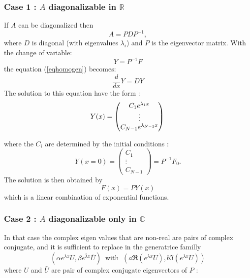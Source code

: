 \documentclass[a4paper,12pt]{article}
\begin{document}
 \subsubsection*{Case 1 : $A$ diagonalizable in $\mathbb{R}$}
 If $A$ can be diagonalized then 
  \begin{equation}
 A=P D P^{-1},
 \end{equation}
 where $D$ is  diagonal (with eigenvalues $\lambda_i$) and $P$ is the eigenvector matrix. 
 With the change of variable: 
 \begin{equation}
 Y=P^{-1}F
 \end{equation}
 the equation  (\ref{eqhomogen}) becomes:
  \begin{equation}
\frac{d}{dx}Y=DY
 \end{equation}
The solution to this equation have the form :\\

  \begin{equation}
  Y(x)=\begin{pmatrix}
 C_1 e^{\lambda_1 x} \\
  \vdots\\
 C_{N-1} e^{\lambda_{N-1} x}\end{pmatrix} \\
  \end{equation}
  
 where the $C_i$ are determined by the initial conditions : 
  \begin{equation}
 Y(x=0) =  \begin{pmatrix}
 C_1 \\
  \vdots\\
 C_{N-1}\end{pmatrix}  = P^{-1} F_0. 
 \end{equation}
 The solution is then obtained by 
   \begin{equation}
  F(x)=PY(x)
  \end{equation}
which is a linear combination of exponential functions.

 \subsubsection*{Case 2 : $A$ diagonalizable only in $\mathbb{C}$}
In that case  the complex eigen values that are non-real are pairs of complex conjugate, and it is sufficient to replace in the generatrice familly 
$$ (\alpha e^{\lambda x} U ,  \beta e^{ \bar{\lambda} x} \bar{U}) \ \text{ with } \ (a\Re( e^{\lambda x} U ),  b \Im( e^{\lambda x} U) )$$
 where $U$ and $\bar{U}$ are pair of complex conjugate eigenvectors of $P$ : 
\end{document}
